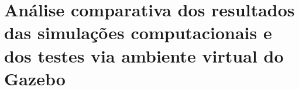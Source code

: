 \section{Análise comparativa dos resultados das simulações computacionais e dos testes via ambiente virtual do Gazebo}